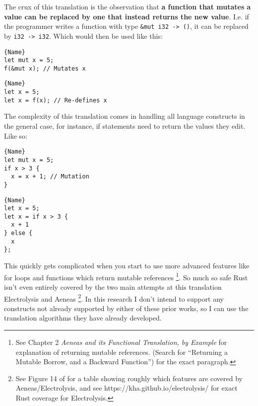 \documentclass[12pt,twoside]{report}
\begin{document}
The crux of this translation is the observation that \textbf{a function that mutates a value can be replaced by one that instead returns the new value}. I.e. if the programmer writes a function with type \verb|&mut i32 -> ()|, it can be replaced by \verb|i32 -> i32|. Which would then be used like this:

\noindent\begin{minipage}{.45\textwidth}
\begin{lstlisting}[caption=Original]{Name}
let mut x = 5;
f(&mut x); // Mutates x
\end{lstlisting}
\end{minipage}\hfill
\begin{minipage}{.45\textwidth}
\begin{lstlisting}[caption=Translated]{Name}
let x = 5;
let x = f(x); // Re-defines x
\end{lstlisting}
\end{minipage}

The complexity of this translation comes in handling all language constructs in the general case, for instance, if statements need to return the values they edit. Like so:

\noindent\begin{minipage}{.45\textwidth}
\begin{lstlisting}[caption=Original]{Name}
let mut x = 5;
if x > 3 {
  x = x + 1; // Mutation
}
\end{lstlisting}
\end{minipage}\hfill
\begin{minipage}{.45\textwidth}
\begin{lstlisting}[caption=Translated]{Name}
let x = 5;
let x = if x > 3 {
  x + 1
} else {
  x
};
\end{lstlisting}
\end{minipage}

This quickly gets complicated when you start to use more advanced features like for loops and functions which return mutable references \footnote{See \citep{aeneas} Chapter 2 \textit{Aeneas and its Functional Translation, by Example} for explanation of returning mutable references. (Search for ``Returning a Mutable Borrow, and a Backward Function'') for the exact paragraph.}. So much so safe Rust isn't even entirely covered by the two main attempts at this translation Electrolysis \citep{ullrich_khaelectrolysis_2024} and Aeneas \citep{aeneas} \footnote{See Figure 14 of \citep{aeneas} for a table showing roughly which features are covered by Aeneas/Electrolysis, and see https://kha.github.io/electrolysis/ for exact Rust coverage for Electrolysis.}. In this research I don't intend to support any constructs not already supported by either of these prior works, so I can use the translation algorithms they have already developed.
\end{document}
